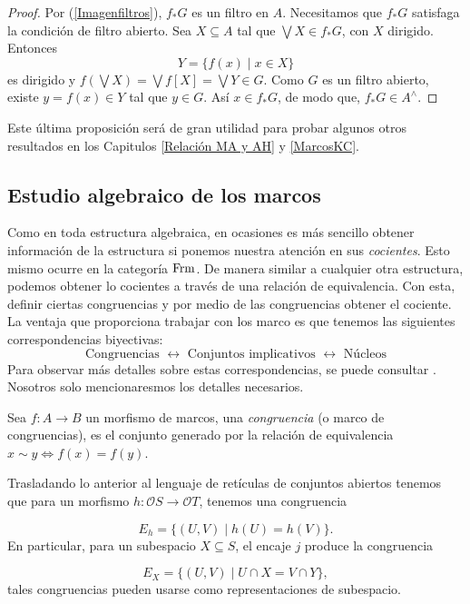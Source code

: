 \begin{proof}
Por (\ref{Imagenfiltros}), $f_*G$ es un filtro en $A$. Necesitamos que $f_*G$ satisfaga la condición de filtro abierto. Sea $X\subseteq A$ tal que $\bigvee X\in f_*G$, con $X$ dirigido. Entonces
\[
Y=\{f(x)\mid x\in X\}
\] 
es dirigido y $f(\bigvee X)=\bigvee f[X]=\bigvee Y\in G$. Como $G$ es un filtro abierto, existe $y=f(x)\in Y$ tal que $y\in G$. Así $x\in f_*G$, de modo que, $f_*G\in A^\wedge$.
\end{proof}

Este última proposición será de gran utilidad para probar algunos otros resultados en los Capitulos \ref{Relación MA y AH} y \ref{MarcosKC}.

\subsection{Estudio algebraico de los marcos}\label{E. algebraico}

Como en toda estructura algebraica, en ocasiones es más sencillo obtener información de la estructura si ponemos nuestra atención en sus \emph{cocientes}. Esto mismo ocurre en la categoría $\mathrm{Frm}$. 
De manera similar a cualquier otra estructura, podemos obtener lo cocientes a través de una relación de equivalencia. Con esta, definir ciertas congruencias y por medio de las congruencias obtener 
el cociente.\\

La ventaja que proporciona trabajar con los marco es que tenemos las siguientes correspondencias biyectivas:
\[
\mbox{Congruencias }\leftrightarrow \mbox{ Conjuntos implicativos }\leftrightarrow \mbox{ Núcleos}
\]
Para observar más detalles sobre estas correspondencias, se puede consultar \cite{A.Z.}. Nosotros solo mencionaresmos los detalles necesarios.

\begin{dfn}
Sea $f:A\to B$ un morfismo de marcos, una \emph{congruencia} (o marco de congruencias), es el conjunto generado por la relación de equivalencia $x\sim y\Leftrightarrow f(x)=f(y)$.
\end{dfn}

Trasladando lo anterior al lenguaje de retículas de conjuntos abiertos tenemos que para un morfismo $h\colon \mathcal{O}S\to\mathcal{O}T$, tenemos una congruencia

\[
E_h=\{(U,V)\mid h(U)=h(V)\}.
\]
En particular, para un subespacio $X\subseteq S$, el encaje $j$ produce la congruencia

\[
E_X=\{(U,V)\mid U\cap X=V\cap Y\},
\]
tales congruencias pueden usarse como representaciones de subespacio.\\

